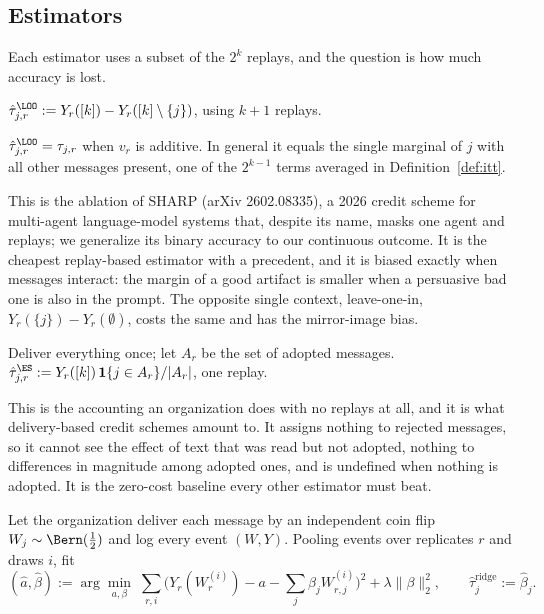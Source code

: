 \documentclass[11pt]{article}
\numberwithin{theorem}{section}
\theoremstyle{definition}
\theoremstyle{problemstyle}
\begin{document}
\subsection{Estimators}

Each estimator uses a subset of the $2^k$ replays, and the question is how much accuracy is lost.

\begin{definition}
$\hat\tau^{\LOO}_{j,r} := Y_r([k]) - Y_r([k]\setminus\{j\})$, using $k+1$ replays.
\end{definition}

\begin{prop}
$\hat\tau^{\LOO}_{j,r}=\tau_{j,r}$ when $v_r$ is additive. In general it equals the single marginal of $j$ with all other
messages present, one of the $2^{k-1}$ terms averaged in Definition~\ref{def:itt}.
\end{prop}

\begin{remark}
This is the ablation of SHARP (arXiv 2602.08335), a 2026 credit scheme for multi-agent language-model systems that,
despite its name, masks one agent and replays; we generalize its binary accuracy to our continuous outcome. It is the
cheapest replay-based estimator with a precedent, and it is biased exactly when messages interact: the margin of a good
artifact is smaller when a persuasive bad one is also in the prompt. The opposite single context, leave-one-in,
$Y_r(\{j\})-Y_r(\emptyset)$, costs the same and has the mirror-image bias.
\end{remark}

\begin{definition}
Deliver everything once; let $A_r$ be the set of adopted messages. $\hat\tau^{\ES}_{j,r} := Y_r([k])\,\mathbf
1\{j\in A_r\}/|A_r|$, one replay.
\end{definition}

\begin{remark}
This is the accounting an organization does with no replays at all, and it is what delivery-based credit schemes
amount to. It assigns nothing to rejected messages, so it cannot see the effect of text that was read but not adopted,
nothing to differences in magnitude among adopted ones, and is undefined when nothing is adopted. It is the zero-cost
baseline every other estimator must beat.
\end{remark}

\begin{definition}\label{def:ridge}
Let the organization deliver each message by an independent coin flip $W_j\sim\Bern(\tfrac12)$ and log every event
$(W,Y)$. Pooling events over replicates $r$ and draws $i$, fit
\[
(\hat a,\hat\beta) := \arg\min_{a,\beta}\;\sum_{r,i}\Big(Y_r(W^{(i)}_r) - a - \textstyle\sum_{j}\beta_jW^{(i)}_{r,j}\Big)^2
+ \lambda\|\beta\|_2^2,
\qquad \hat\tau^{\mathrm{ridge}}_j := \hat\beta_j .
\]
\end{definition}
\end{document}
